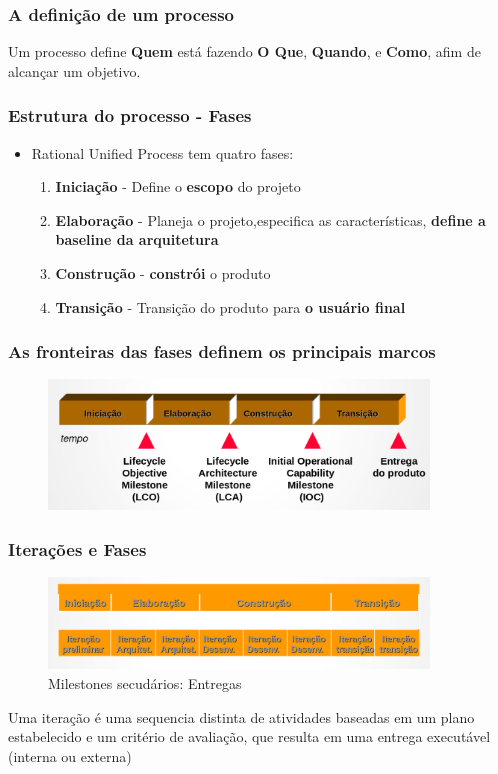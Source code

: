 \begin{frame}
 \frametitle{A definição de um processo}
\begin{block}{}
 Um processo define \textbf{Quem} está fazendo \textbf{O Que}, \textbf{Quando}, e \textbf{Como}, afim de alcançar um objetivo.
\end{block}

\end{frame}
\begin{frame}
 \frametitle{Estrutura do processo - Fases}
\begin{itemize}
 \item Rational Unified Process tem quatro fases:
 \begin{enumerate}
  \item \textbf{Iniciação} - Define o \textbf{escopo} do projeto
  \item \textbf{Elaboração} - Planeja o projeto,especifica as características, \textbf{define a baseline da arquitetura} 
  \item \textbf{Construção} - \textbf{constrói} o produto
  \item \textbf{Transição} - Transição do produto para \textbf{o usuário final}
 \end{enumerate}
\end{itemize}


\end{frame}

\begin{frame}
\frametitle{As fronteiras das fases definem os principais marcos}
\begin{figure}
   \centering
   \includegraphics[width = 0.9\textwidth]{figs/fig20.png}
  \end{figure}
\end{frame}

\begin{frame}
\frametitle{Iterações e Fases}
\begin{figure}
   \centering
   \includegraphics[width = 0.9\textwidth]{figs/fig21.png}
   \caption{Milestones secudários: Entregas}
  \end{figure}
  \begin{block}{}
   Uma iteração é uma sequencia distinta de atividades baseadas em um plano estabelecido e um critério de avaliação, que resulta em uma entrega executável (interna ou externa)
  \end{block}
\end{frame}

